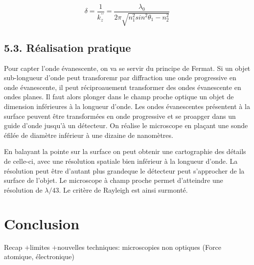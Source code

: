 \documentclass[french, a4paper, 10pt, twocolumn, landscape]{article}
\begin{document}
\begin{equation}
	\delta = \frac{1}{k_z^{\prime\prime}}=\dfrac{\lambda_0}{2\pi\sqrt{n_1^2sin^2\theta_1-n_2^2}}
\end{equation}

\subsection*{5.3. Réalisation pratique}

Pour capter l'onde évanescente, on va se servir du principe de Fermat. Si un objet sub-longueur d'onde  peut transforemr par diffraction une onde progressive en onde évanescente, il peut réciproauement transformer des ondes évanescente en ondes planes. Il faut alors plonger dans le champ proche optique un objet de dimension inférieures à la longueur d'onde. Les ondes évanescentes présentent à la surface peuvent être transformées en onde progressive et se proapger dans un guide d'onde jusqu'à un détecteur. On réalise le microscope en plaçant une sonde éfilée de diamètre inférieur à une dizaine de nanomètres.\medskip

En balayant la pointe sur la surface on peut obtenir une cartographie des détails de celle-ci, avec une résolution spatiale bien inférieur à la longueur d'onde. La résolution peut être d'autant plus grandeque le détecteur peut s'approcher de la surface de l'objet. Le microscope à champ proche permet d'atteindre une résolution de $\lambda /43$. Le critère de Rayleigh est ainsi surmonté.
\section*{Conclusion}

Recap $+$limites $+$nouvelles techniques: microscopies non optiques (Force atomique, électronique)
\end{document}
